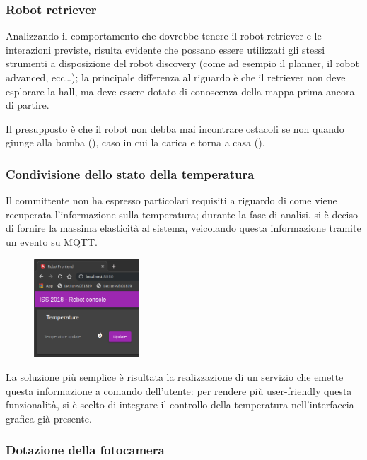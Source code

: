 \subsubsection{Robot retriever}

Analizzando il comportamento che dovrebbe tenere il robot retriever e le interazioni previste, risulta evidente che possano essere utilizzati gli stessi strumenti a disposizione del robot discovery (come ad esempio il planner, il robot advanced, ecc\ldots);
la principale differenza al riguardo è che il retriever non deve esplorare la hall, ma deve essere dotato di conoscenza della mappa prima ancora di partire.

Il presupposto è che il robot non debba mai incontrare ostacoli se non quando giunge alla bomba (), caso in cui la carica e torna a casa ().

\subsubsection{Condivisione dello stato della temperatura}

Il committente non ha espresso particolari requisiti a riguardo di come viene recuperata l'informazione sulla temperatura;
durante la fase di analisi, si è deciso di fornire la massima elasticità al sistema, veicolando questa informazione tramite un evento su MQTT\@.

\begin{figure}[H]
  \centering
  \includegraphics[width=0.35\textwidth]{res/sprint4/temp-ctrl.png}%
  \label{fig:sp4:temp-ctrl}
\end{figure}

La soluzione più semplice è risultata la realizzazione di un servizio che emette questa informazione a comando dell'utente:
per rendere più user-friendly questa funzionalità, si è scelto di integrare il controllo della temperatura nell'interfaccia grafica già presente.

\subsubsection{Dotazione della fotocamera}

